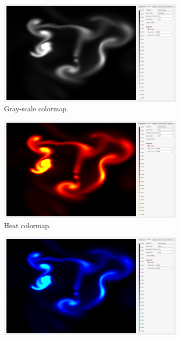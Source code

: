\begin{figure}
\begin{subfigure}{0.44\textwidth}
	\end{subfigure}	
	\begin{subfigure}{0.44\textwidth}
		\centering
		\includegraphics[width=\textwidth, trim={35px 30px 430px 30px}, clip]{colormapping/img/grayscale}
		\caption{Gray-scale colormap.}
		\label{fig:colormapping:intro:differntColorMaps:grayscale}
	\end{subfigure}	
	\begin{subfigure}{0.44\textwidth}
		\centering
		\includegraphics[width=\textwidth, trim={35px 30px 430px 30px}, clip]{colormapping/img/heat}
		\caption{Heat colormap.}
		\label{fig:colormapping:intro:differntColorMaps:heat}
	\end{subfigure}
	\begin{subfigure}{0.44\textwidth}
		\centering
		\includegraphics[width=\textwidth, trim={35px 30px 430px 30px}, clip]{colormapping/img/cold}

\end{subfigure}
\end{figure}
